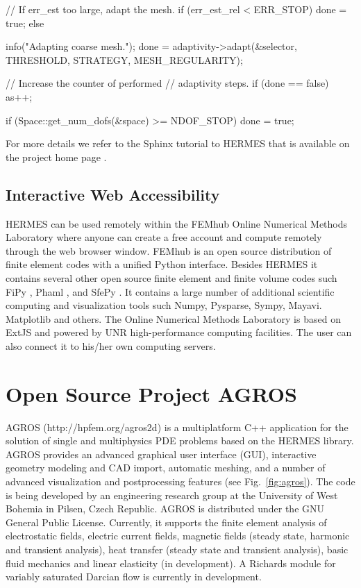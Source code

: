 \documentclass[final,3p,times,twocolumn]{elsarticle}
\begin{document}
\begin{code}
  // If err_est too large, adapt the mesh.
  if (err_est_rel < ERR_STOP) done = true;
  else
  {
    info("Adapting coarse mesh.");
    done = adaptivity->adapt(&selector, THRESHOLD, 
                       STRATEGY, MESH_REGULARITY);

    // Increase the counter of performed 
    // adaptivity steps.
    if (done == false)  as++;
  }
  if (Space::get_num_dofs(&space) >= NDOF_STOP) 
    done = true;
\end{code}
For more details we refer to the 
Sphinx tutorial to HERMES that is available on the 
project home page \cite{hermes}. 

\subsection{Interactive Web Accessibility}
\label{sec:onlinelab}

HERMES can be used remotely within the FEMhub Online Numerical Methods Laboratory
\cite{onlinelab} where anyone can create a free account and compute remotely 
through the web browser window. FEMhub \cite{femhub} is an open source distribution 
of finite element codes with a unified Python interface.
Besides HERMES it contains several other open source finite element and finite volume 
codes such FiPy \cite{fipy}, Phaml \cite{phaml}, and SfePy \cite{sfepy}.
It contains a large number of additional scientific computing and visualization 
tools such Numpy, Pysparse, Sympy, Mayavi. Matplotlib and others.   
The Online Numerical Methods Laboratory is based on ExtJS and powered 
by UNR high-performance computing facilities. The user can also connect 
it to his/her own computing servers.  

\section{Open Source Project AGROS}
\label{sec:agros}

AGROS (http://hpfem.org/agros2d) is a multiplatform C++ application for the solution 
of single and multiphysics PDE problems based on the HERMES library. AGROS provides 
an advanced graphical user interface (GUI), interactive geometry modeling and CAD import, 
automatic meshing, and a number of advanced visualization and postprocessing features (see Fig.~\ref{fig:agros}). 
The code is being developed by an engineering research group at the University of West 
Bohemia in Pilsen, Czech Republic. AGROS is distributed under the GNU General Public 
License. Currently, it supports the finite element analysis of electrostatic fields,
electric current fields, magnetic fields (steady state, harmonic and transient analysis),
heat transfer (steady state and transient analysis), basic fluid mechanics and linear 
elasticity (in development). A Richards module for variably saturated Darcian %
flow is currently in development. 
\end{document}
